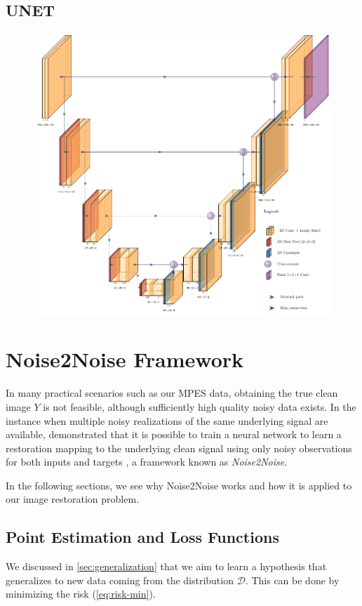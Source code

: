 \subsection{UNET}
\begin{figure}[h]
    \centering
    \includegraphics[width=1\linewidth]{images/unet_architecture.pdf}
    \caption{}
    \label{fig:unet-architecture}
\end{figure}

\section{Noise2Noise Framework}
In many practical scenarios such as our \gls{MPES} data, obtaining the true clean image $Y$ is not feasible, although sufficiently high quality noisy data exists. In the instance when multiple noisy realizations of the same underlying signal are available, \citeauthor{lehtinenNoise2NoiseLearningImage2018} demonstrated that it is possible to train a neural network to learn a restoration mapping to the underlying clean signal using only noisy observations for both inputs and targets \cite{lehtinenNoise2NoiseLearningImage2018}, a framework known as \textit{Noise2Noise}. 

In the following sections, we see why Noise2Noise works and how it is applied to our image restoration problem.
\subsection{Point Estimation and Loss Functions}
We discussed in \cref{sec:generalization} that we aim to learn a hypothesis that generalizes to new data coming from the distribution $\mathcal{D}$. This can be done by minimizing the risk (\cref{eq:risk-min}). 

